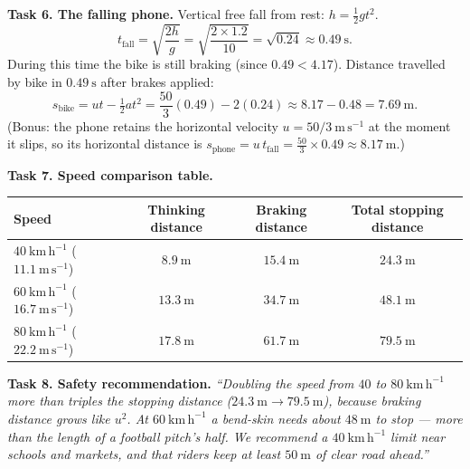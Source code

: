 \documentclass[11pt]{article}
\begin{document}
\textbf{Task 6. The falling phone.}
Vertical free fall from rest: $h = \tfrac{1}{2}gt^2$.
\[ t_{\text{fall}} = \sqrt{\frac{2h}{g}} = \sqrt{\frac{2\times 1.2}{10}} = \sqrt{0.24} \approx 0.49\ \mathrm{s}. \]
During this time the bike is still braking (since $0.49 < 4.17$). Distance travelled by bike in $0.49\ \mathrm{s}$ after brakes applied:
\[ s_{\text{bike}} = u t - \tfrac{1}{2} a t^2 = \frac{50}{3}(0.49) - 2(0.24) \approx 8.17 - 0.48 = 7.69\ \mathrm{m}. \]
(Bonus: the phone retains the horizontal velocity $u = 50/3\ \mathrm{m\,s^{-1}}$ at the moment it slips, so its horizontal distance is $s_{\text{phone}} = u\,t_{\text{fall}} = \frac{50}{3}\times 0.49 \approx 8.17\ \mathrm{m}$.)

\textbf{Task 7. Speed comparison table.}

\begin{center}
\begin{tabular}{|l|c|c|c|}
\hline
\rowcolor{popblueL} Speed & Thinking distance & Braking distance & Total stopping distance \\ \hline
$40\ \mathrm{km\,h^{-1}}$ ($11.1\ \mathrm{m\,s^{-1}}$) & $8.9\ \mathrm{m}$ & $15.4\ \mathrm{m}$ & $24.3\ \mathrm{m}$ \\ \hline
$60\ \mathrm{km\,h^{-1}}$ ($16.7\ \mathrm{m\,s^{-1}}$) & $13.3\ \mathrm{m}$ & $34.7\ \mathrm{m}$ & $48.1\ \mathrm{m}$ \\ \hline
$80\ \mathrm{km\,h^{-1}}$ ($22.2\ \mathrm{m\,s^{-1}}$) & $17.8\ \mathrm{m}$ & $61.7\ \mathrm{m}$ & $79.5\ \mathrm{m}$ \\ \hline
\end{tabular}
\end{center}

\textbf{Task 8. Safety recommendation.}
\emph{``Doubling the speed from $40$ to $80\ \mathrm{km\,h^{-1}}$ more than \emph{triples} the stopping distance ($24.3\ \mathrm{m} \to 79.5\ \mathrm{m}$), because braking distance grows like $u^2$. At $60\ \mathrm{km\,h^{-1}}$ a bend-skin needs about $48\ \mathrm{m}$ to stop — more than the length of a football pitch's half. We recommend a $40\ \mathrm{km\,h^{-1}}$ limit near schools and markets, and that riders keep at least $50\ \mathrm{m}$ of clear road ahead.''}
\end{document}
